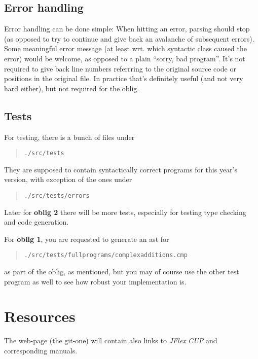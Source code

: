 \documentclass[10pt,freeform]{handout}[2014/08/13]
\begin{document}
\subsection{Error handling}
\label{sec:error-handling}

Error handling can be done simple: When hitting an error, parsing should
stop (as opposed to try to continue and give back an avalanche of
subsequent errors). Some meaningful error message (at least wrt. which
syntactic class caused the error) would be welcome, as opposed to a plain
``sorry, bad program''. It's not required to give back line numbers
referrring to the original source code or positions in the original
file. In practice that's definitely useful (and not very hard either), but
not required for the oblig.




\subsection{Tests}
\label{sec:tests}

For testing, there is a bunch of files under

\begin{quote}
  \texttt{./src/tests}
\end{quote}

They are supposed to contain syntactically correct programs for this year's
version, with exception of the ones under
\begin{quote}
  \texttt{./src/tests/errors}
\end{quote}
Later for \textbf{oblig 2} there will be more tests, especially for testing
type checking and code generation. 


For \textbf{oblig 1}, you are requested to generate an ast for
\begin{quote}
  \texttt{./src/tests/fullprograms/complexadditions.cmp}  
\end{quote}
as part of the oblig, as mentioned, but you may of course use the other
test program as well to see how robust your implementation is. 








\section{Resources}
\label{sec:resources}

The web-page (the git-one) will contain also links to \textsl{JFlex}
\textsl{CUP} and corresponding manuals.
\end{document}
